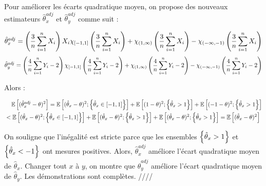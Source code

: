 \documentclass[../main.tex]{subfiles}
\begin{document}
\begin{CJK*}{UTF8}{gbsn}
Pour améliorer les écarts quadratique moyen, on propose des nouveaux estimateurs $\hat{\theta}_{x}^{adj}$
et $\hat{\theta}_{y}^{adj}$ comme suit :

\begin{equation*}
    \hat{\theta}_{x}^{adj} = \bracket{\frac{3}{n}\sum_{i=1}^{n}X_i}X_i \chi_{[-1,1]}\bracket{\frac{3}{n}\sum_{i=1}^{n}X_i} 
    + \chi_{(1,\infty)}\bracket{\frac{3}{n}\sum_{i=1}^{n}X_i} - \chi_{(-\infty,-1)}\bracket{\frac{3}{n}\sum_{i=1}^{n}X_i}
\end{equation*}
\begin{equation*}
    \hat{\theta}_{y}^{adj} = 
    \bracket{\frac{4}{n}\sum_{i=1}^{n}Y_i - 2} \chi_{[-1,1]}\bracket{\frac{4}{n}\sum_{i=1}^{n}Y_i - 2} 
    + \chi_{(1,\infty)}\bracket{\frac{4}{n}\sum_{i=1}^{n}Y_i - 2} - \chi_{(-\infty,-1)}\bracket{\frac{4}{n}\sum_{i=1}^{n}Y_i - 2}
\end{equation*}

Alors :

\begin{equation*}
    \begin{split}
        &\tab[0.4cm]
    \mathbb{E} \squared{(\hat{\theta}_{x}^{adj}-\theta)^2} =
    \mathbb{E} \squared{(\hat{\theta}_{x}-\theta)^2 ; \curly{\hat{\theta}_{x} \in [-1,1]}} + 
    \mathbb{E} \squared{(1-\theta)^2 ; \curly{\hat{\theta}_{x} > 1}} + 
    \mathbb{E} \squared{(-1-\theta)^2 ; \curly{\hat{\theta}_{x} > 1}}
    \\ & < \mathbb{E} \squared{(\hat{\theta}_{x}-\theta)^2 ; \curly{\hat{\theta}_{x} \in [-1,1]}} + 
    \mathbb{E} \squared{(\hat{\theta}_{x}-\theta)^2 ; \curly{\hat{\theta}_{x} > 1}} + 
    \mathbb{E} \squared{(\hat{\theta}_{x}-\theta)^2 ; \curly{\hat{\theta}_{x} > 1}} = \mathbb{E} \squared{(\hat{\theta}_{x}-\theta)^2}
    \end{split}
\end{equation*}

On souligne que l'inégalité est stricte parce que les ensembles 
$\curly{\hat{\theta}_{x} > 1}$ et $\curly{\hat{\theta}_{x} < -1}$ ont mesures positives.
Alors, $\hat{\theta}_{x}^{adj}$ améliore l'écart quadratique moyen de $\hat{\theta}_{x}$.
Changer tout $x$ à $y$, on montre que $\hat{\theta}_{y}^{adj}$ améliore l'écart quadratique moyen de $\hat{\theta}_{y}$.
Les démonstrations sont complètes. ////

\end{CJK*}
\end{document}
